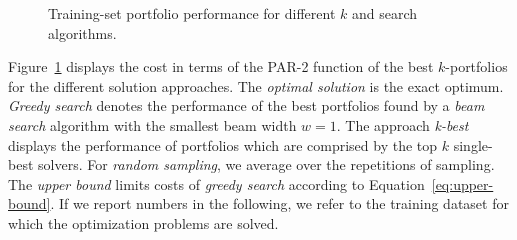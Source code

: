 \documentclass[conference]{IEEEtran}
\begin{document}
\begin{figure}[t]
	\centering
	\hfil
	\caption{
		Training-set portfolio performance for different $k$ and search algorithms.
	}
	\label{fig:search-train-objective}
\end{figure}

Figure~\ref{fig:search-train-objective} displays the cost in terms of the PAR-2 function of the best $k$-portfolios for the different solution approaches. 
The \emph{optimal solution} is the exact optimum.
\emph{Greedy search} denotes the performance of the best portfolios found by a \emph{beam search} algorithm with the smallest beam width $w=1$. 
The approach \emph{k-best} displays the performance of portfolios which are comprised by the top $k$ single-best solvers. 
For \emph{random sampling}, we average over the repetitions of sampling.
The \emph{upper bound} limits costs of \emph{greedy search} according to Equation~\ref{eq:upper-bound}.
If we report numbers in the following, we refer to the training dataset for which the optimization problems are solved.
\end{document}
